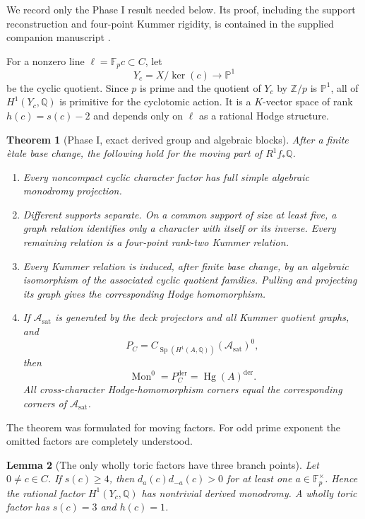 \documentclass[11pt]{article}
\newtheorem{theorem}{Theorem}[section]
\newtheorem{lemma}[theorem]{Lemma}
\theoremstyle{definition}
\theoremstyle{remark}
\newcommand{\Q}{\mathbb Q}
\newcommand{\Z}{\mathbb Z}
\newcommand{\F}{\mathbb F}
\newcommand{\PP}{\mathbb P}
\newcommand{\A}{\mathcal A}
\newcommand{\Mon}{\operatorname{Mon}}
\newcommand{\Hg}{\operatorname{Hg}}
\newcommand{\Sp}{\operatorname{Sp}}
\newcommand{\sat}{\mathrm{sat}}
\newcommand{\der}{\mathrm{der}}
\begin{document}
We record only the Phase I result needed below.  Its proof, including the support reconstruction and four-point Kummer rigidity, is contained in the supplied companion manuscript \cite{KisI}.

For a nonzero line $\ell=\F_pc\subset C$, let
\[
 Y_c=X/\ker(c)\longrightarrow\PP^1
\]
be the cyclic quotient.  Since $p$ is prime and the quotient of $Y_c$ by $\Z/p$ is $\PP^1$, all of $H^1(Y_c,\Q)$ is primitive for the cyclotomic action.  It is a $K$-vector space of rank $h(c)=s(c)-2$ and depends only on $\ell$ as a rational Hodge structure.

\begin{theorem}[Phase I, exact derived group and algebraic blocks]\label{thm:phaseI}
After a finite \`etale base change, the following hold for the moving part of $R^1f_*\Q$.
\begin{enumerate}[label=\textup{(\alph*)}]
\item Every noncompact cyclic character factor has full simple algebraic monodromy projection.
\item Different supports separate.  On a common support of size at least five, a graph relation identifies only a character with itself or its inverse.  Every remaining relation is a four-point rank-two Kummer relation.
\item Every Kummer relation is induced, after finite base change, by an algebraic isomorphism of the associated cyclic quotient families.  Pulling and projecting its graph gives the corresponding Hodge homomorphism.
\item If $\A_{\sat}$ is generated by the deck projectors and all Kummer quotient graphs, and
\[
 P_C=C_{\Sp(H^1(A,\Q))}(\A_{\sat})^0,
\]
then
\[
 \Mon^0=P_C^{\der}=\Hg(A)^{\der}.
\]
All cross-character Hodge-homomorphism corners equal the corresponding corners of $\A_{\sat}$.
\end{enumerate}
\end{theorem}

The theorem was formulated for moving factors.  For odd prime exponent the omitted factors are completely understood.

\begin{lemma}[The only wholly toric factors have three branch points]\label{lem:toric-support3}
Let $0\ne c\in C$.  If $s(c)\ge4$, then $d_a(c)d_{-a}(c)>0$ for at least one $a\in\F_p^\times$.  Hence the rational factor $H^1(Y_c,\Q)$ has nontrivial derived monodromy.  A wholly toric factor has $s(c)=3$ and $h(c)=1$.
\end{lemma}
\end{document}
